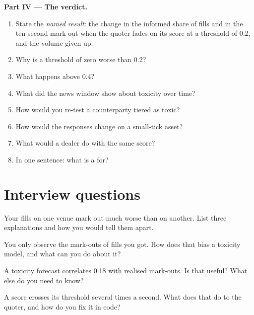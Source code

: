 \begin{problem}
\medskip\noindent\textbf{Part IV --- The verdict.}
\begin{enumerate}[resume]
\item State the \emph{named result}: the change in the informed share of fills and in the ten-second mark-out when the quoter fades on its score at
a threshold of 0.2, and the volume given up.
\item Why is a threshold of zero worse than 0.2?
\item What happens above 0.4?
\item What did the news window show about toxicity over time?
\item How would you re-test a counterparty tiered as toxic?
\item How would the responses change on a small-tick asset?
\item What would a dealer do with the same score?
\item In one sentence: what is a  for?
\end{enumerate}
\end{problem}

\section{Interview questions}

\begin{interviewq}\label{iq:hf:adverse-selection-and-toxicity:1}
Your fills on one venue mark out much worse than on another. List three explanations and how you would tell them apart.
\end{interviewq}

\begin{interviewq}\label{iq:hf:adverse-selection-and-toxicity:2}
You only observe the mark-outs of fills you got. How does that bias a toxicity model, and what can you do about it?
\end{interviewq}

\begin{interviewq}\label{iq:hf:adverse-selection-and-toxicity:3}
A toxicity forecast correlates 0.18 with realised mark-outs. Is that useful? What else do you need to know?
\end{interviewq}

\begin{interviewq}\label{iq:hf:adverse-selection-and-toxicity:4}
A score crosses its threshold several times a second. What does that do to the quoter, and how do you fix it in code?
\end{interviewq}

